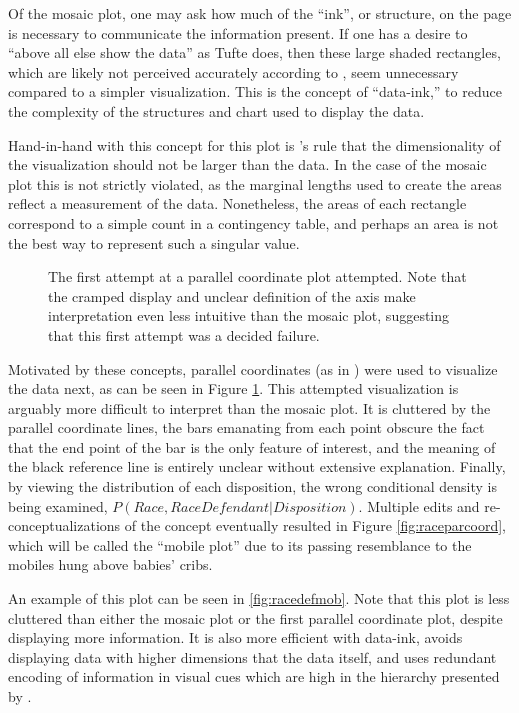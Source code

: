 Of the mosaic plot, one may ask how much of the ``ink'', or structure, on the page is necessary to communicate the information
present. If one has a desire to ``above all else show the data'' as Tufte does, then these large shaded rectangles, which are
likely not perceived accurately according to \citeauthor{cleveland1987}, seem unnecessary compared to a simpler
visualization. This is the concept of ``data-ink,'' to reduce the complexity of the structures and chart used to display the
data.

Hand-in-hand with this concept for this plot is \citeauthor{VisualDisplayQuant}'s rule that the dimensionality of the
visualization should not be larger than the data. In the case of the mosaic plot this is not strictly violated, as the marginal
lengths used to create the areas reflect a measurement of the data. Nonetheless, the areas of each rectangle correspond to a
simple count in a contingency table, and perhaps an area is not the best way to represent such a singular value.

\begin{figure}[!h]
  \centering
  \caption[First Parallel Coordinate Attempt]{The first attempt at a parallel coordinate plot attempted. Note that the cramped
    display and unclear definition of the axis make interpretation even less intuitive than the mosaic plot, suggesting that this
    first attempt was a decided failure.}
  \label{fig:firstparcoord}
\end{figure}

Motivated by these concepts, parallel coordinates (as in \cite{wegman1990}) were used to visualize the data next, as can be seen
in Figure \ref{fig:firstparcoord}. This attempted visualization is arguably more difficult to interpret than the mosaic plot. It
is cluttered by the parallel coordinate lines, the bars emanating from each point obscure the fact that the end point of the bar
is the only feature of interest, and the meaning of the black reference line is entirely unclear without extensive
explanation. Finally, by viewing the distribution of each disposition, the wrong conditional density is being examined,
$P(Race,Race Defendant|Disposition)$. Multiple edits and re-conceptualizations of the concept eventually resulted in Figure
\ref{fig:raceparcoord}, which will be called the ``mobile plot'' due to its passing resemblance to the mobiles hung above babies'
cribs.

An example of this plot can be seen in  \ref{fig:racedefmob}. Note that this plot is less cluttered than either the mosaic plot or
the first parallel coordinate plot, despite displaying more information. It is also more efficient with data-ink, avoids
displaying data with higher dimensions that the data itself, and uses redundant encoding of information in visual cues which are
high in the hierarchy presented by \cite{cleveland1987}.

